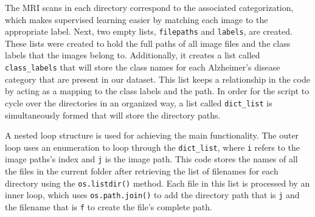 \documentclass[12pt,onecolumn]{report}
\begin{document}
\begin{itemize}
    The MRI scans in each directory correspond to the associated categorization, which makes supervised learning easier by matching each image to the appropriate label. Next, two empty lists, \texttt{filepaths} and \texttt{labels}, are created. These lists were created to hold the full paths of all image files and the class labels that the images belong to. Additionally, it creates a list called \texttt{class\_labels} that will store the class names for each Alzheimer's disease category that are present in our dataset. This list keeps a relationship in the code by acting as a mapping to the class labels and the path. In order for the script to cycle over the directories in an organized way, a list called \texttt{dict\_list} is simultaneously formed that will store the directory paths.

    A nested loop structure is used for achieving the main functionality. The outer loop uses an enumeration to loop through the \texttt{dict\_list}, where \texttt{i} refers to the image paths's index and \texttt{j} is the image path. This code stores the names of all the files in the current folder after retrieving the list of filenames for each directory using the \texttt{os.listdir()} method. Each file in this list is processed by an inner loop, which uses \texttt{os.path.join()} to add the directory path that is \texttt{j} and the filename that is \texttt{f} to create the file's complete path.


\end{itemize}
\end{document}
